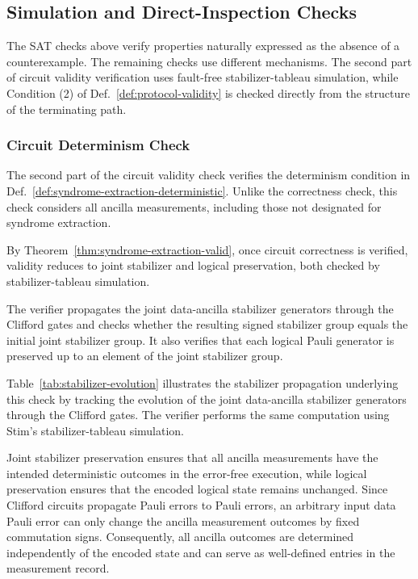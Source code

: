\documentclass[acmsmall,screen,review,anonymous,nonacm]{acmart}
\begin{document}
\subsection{Simulation and Direct-Inspection Checks}
\label{subsec:simulation-direct-checks}

The SAT checks above verify properties naturally
expressed as the absence of a counterexample.
The remaining checks use different mechanisms.
The second part of circuit validity verification
uses fault-free stabilizer-tableau simulation,
while Condition (2) of
Def.~\ref{def:protocol-validity}
is checked directly from the structure of
the terminating path.

\subsubsection{Circuit Determinism Check}
\label{subsec:circuit-validity-check}

The second part of the circuit validity check
verifies the determinism condition in
Def.~\ref{def:syndrome-extraction-deterministic}.
Unlike the correctness check, this check
considers all ancilla measurements, including
those not designated for syndrome extraction.

By Theorem~\ref{thm:syndrome-extraction-valid}, once circuit correctness
is verified, validity reduces to joint stabilizer and logical preservation,
both checked by stabilizer-tableau simulation.

The verifier propagates the joint data-ancilla
stabilizer generators through the Clifford
gates and checks whether the resulting signed
stabilizer group equals the initial joint
stabilizer group. It also verifies that each
logical Pauli generator is preserved up to
an element of the joint stabilizer group.

Table~\ref{tab:stabilizer-evolution} illustrates
the stabilizer propagation underlying this
check by tracking the evolution of the joint
data-ancilla stabilizer generators through
the Clifford gates. The verifier performs
the same computation using Stim's stabilizer-tableau
simulation.

Joint stabilizer preservation ensures that
all ancilla measurements have the intended
deterministic outcomes in the error-free
execution, while logical preservation ensures
that the encoded logical state remains
unchanged. Since Clifford circuits propagate
Pauli errors to Pauli errors, an arbitrary
input data Pauli error can only change the
ancilla measurement outcomes by fixed
commutation signs. Consequently, all ancilla
outcomes are determined independently of
the encoded state and can serve as well-defined
entries in the measurement record.
\end{document}
